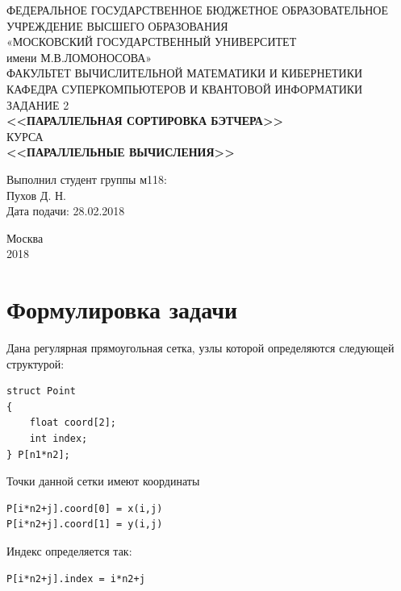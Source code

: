 \documentclass[14pt]{extarticle}
\begin{document}
\begin{titlepage}
	\begin{center}
		\small{ФЕДЕРАЛЬНОЕ ГОСУДАРСТВЕННОЕ БЮДЖЕТНОЕ ОБРАЗОВАТЕЛЬНОЕ}\\ 
			УЧРЕЖДЕНИЕ ВЫСШЕГО ОБРАЗОВАНИЯ\\
			«МОСКОВСКИЙ ГОСУДАРСТВЕННЫЙ УНИВЕРСИТЕТ\\
			имени М.В.ЛОМОНОСОВА»\\
		\hfill \break
		ФАКУЛЬТЕТ ВЫЧИСЛИТЕЛЬНОЙ МАТЕМАТИКИ И КИБЕРНЕТИКИ\\
		КАФЕДРА СУПЕРКОМПЬЮТЕРОВ И КВАНТОВОЙ ИНФОРМАТИКИ\\
		\vfill
		ЗАДАНИЕ 2 \\
		\textbf{<<ПАРАЛЛЕЛЬНАЯ СОРТИРОВКА БЭТЧЕРА>>}\\
		КУРСА \\
		\textbf{<<ПАРАЛЛЕЛЬНЫЕ ВЫЧИСЛЕНИЯ>>}\\
	\end{center}	
	\vfill
	\begin{flushright}
		Выполнил студент группы м118:\\
		Пухов Д. Н.\\
		Дата подачи: 28.02.2018
		\vfill
	\end{flushright}
	
	
	\begin{center}
		Москва \\
		2018
	\end{center}
	
	\thispagestyle{empty}

\end{titlepage}

\tableofcontents
\newpage



\section{Формулировка задачи}
Дана регулярная прямоугольная сетка, узлы которой определяются следующей структурой:
\begin{lstlisting}
struct Point
{
	float coord[2];
	int index;
} P[n1*n2];
\end{lstlisting}
Точки данной сетки имеют координаты
\begin{lstlisting}
P[i*n2+j].coord[0] = x(i,j)
P[i*n2+j].coord[1] = y(i,j)
\end{lstlisting}
Индекс определяется так:
\begin{lstlisting}
P[i*n2+j].index = i*n2+j
\end{lstlisting}
\end{document}
